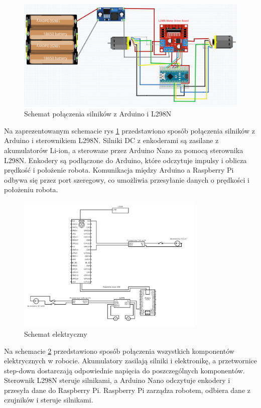 \documentclass[a4paper,twoside,12pt]{book}
\begin{document}
\begin{figure}[!hb]
	\centering
	\includegraphics[width=1\textwidth]{images/schema_arduino.png}
	\caption{Schemat połączenia silników z Arduino i L298N}
	\label{fig:arduino-schema}
	\end{figure}
Na zaprezentowanym schemacie rys \ref{fig:arduino-schema} przedstawiono sposób połączenia silników z Arduino i sterownikiem L298N. Silniki DC z enkoderami są zasilane z akumulatorów Li-ion, a sterowane przez Arduino Nano za pomocą sterownika L298N. Enkodery są podłączone do Arduino, które odczytuje impulsy i oblicza prędkość i położenie robota. Komunikacja między Arduino a Raspberry Pi odbywa się przez port szeregowy, co umożliwia przesyłanie danych o prędkości i położeniu robota.

\newpage
\begin{figure}[!hb]
	\centering
	\includegraphics[width=0.8\textwidth]{images/circuit.png}
	\caption{Schemat elektryczny}
	\label{fig:schemat-elektryczny}
	\end{figure}
Na schemacie \ref{fig:schemat-elektryczny} przedstawiono sposób połączenia wszystkich komponentów elektrycznych w robocie. Akumulatory zasilają silniki i elektronikę, a przetwornice step-down dostarczają odpowiednie napięcia do poszczególnych komponentów. Sterownik L298N steruje silnikami, a Arduino Nano odczytuje enkodery i przesyła dane do Raspberry Pi. Raspberry Pi zarządza robotem, odbiera dane z czujników i steruje silnikami. 
\newpage
\end{document}
